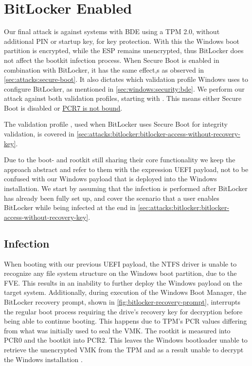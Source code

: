 \section{BitLocker Enabled}

Our final attack is against systems with \ac{BDE} using a \ac{TPM} 2.0, without additional \ac{PIN} or startup key, for key protection.
With this the Windows boot partition is encrypted, while the \ac{ESP} remains unencrypted, thus BitLocker does not affect the bootkit infection process.
When Secure Boot is enabled in combination with BitLocker, it has the same effect,s as observed in \autoref{sec:attacks:secure-boot}.
It also dictates which validation profile Windows uses to configure BitLocker, as mentioned in \autoref{sec:windows:security:bde}.
We perform our attack against both validation profiles, starting with \hyperref[tab:pcr-usage]{}.
This means either Secure Boot is disabled or \hyperlink{pcr7-binding}{\ac{PCR}7 is not bound}.

The validation profile \hyperref[tab:pcr-usage]{}, used when BitLocker uses Secure Boot for integrity validation, is covered in \autoref{sec:attacks:bitlocker:bitlocker-access-without-recovery-key}.

Due to the boot- and rootkit still sharing their core functionality we keep the approach abstract and refer to them with the expression \ac{UEFI} payload, not to be confused with our Windows payload that is deployed into the Windows installation.
We start by assuming that the infection is performed after BitLocker has already been fully set up, and cover the scenario that a user enables BitLocker while being infected at the end in \autoref{sec:attacks:bitlocker:bitlocker-access-without-recovery-key}.

\subsection{Infection}

When booting with our previous \ac{UEFI} payload, the \ac{NTFS} driver is unable to recognize any file system structure on the Windows boot partition, due to the \ac{FVE}.
This results in an inability to further deploy the Windows payload on the target system.
Additionally, during execution of the Windows Boot Manager, the BitLocker recovery prompt, shown in \autoref{fig:bitlocker-recovery-prompt}, interrupts the regular boot process requiring the drive's recovery key for decryption before being able to continue booting.
This happens due to \ac{TPM}'s \ac{PCR} values differing from what was initially used to seal the \ac{VMK}.
The rootkit is measured into \ac{PCR}0 and the bootkit into \ac{PCR}2.
This leaves the Windows bootloader unable to retrieve the unencrypted \ac{VMK} from the \ac{TPM} and as a result unable to decrypt the Windows installation \cite[Section 12]{windows-internals-7-part2}.

